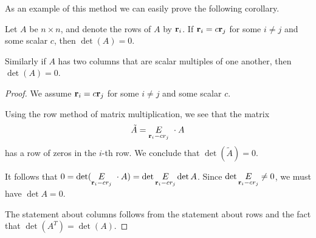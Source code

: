 \begin{frame}
As an example of this method we can easily prove the following corollary.
\begin{corollary}
Let $A$ be $n\times n$, and denote the rows of $A$ by ${\mathbf r}_i$. If ${\mathbf r}_i=c{\mathbf r}_j$ for some $i\ne j$ and some scalar $c$, then $\det(A)=0$. 

Similarly if $A$ has two columns that are scalar multiples of one another, then $\det(A)=0$.  
\end{corollary}
\pause
\begin{proof}
We assume ${\mathbf r}_i=c{\mathbf r}_j$ for some $i\ne j$ and some scalar $c$. 

\pause Using the row method of matrix multiplication, we see that the matrix  
\[
\tilde{A}=\underset{\boldr_i-cr_j}{E}\ \cdot A
\]
has a row of zeros in the $i$-th row. We conclude that $\det(\tilde{A})=0$. 

\pause
It follows that $0=\det(\underset{{\mathbf r}_i-cr_j}{E}\ \cdot A)=\det \underset{{\mathbf r}_i-cr_j}{E}\det A$. Since $\det \underset{{\mathbf r}_i-cr_j}{E}\ne 0$, we must have $\det A=0$. 

\pause 
The statement about columns follows from the statement about rows and the fact that $\det(A^T)=\det(A)$. 
\end{proof}
\end{frame}







